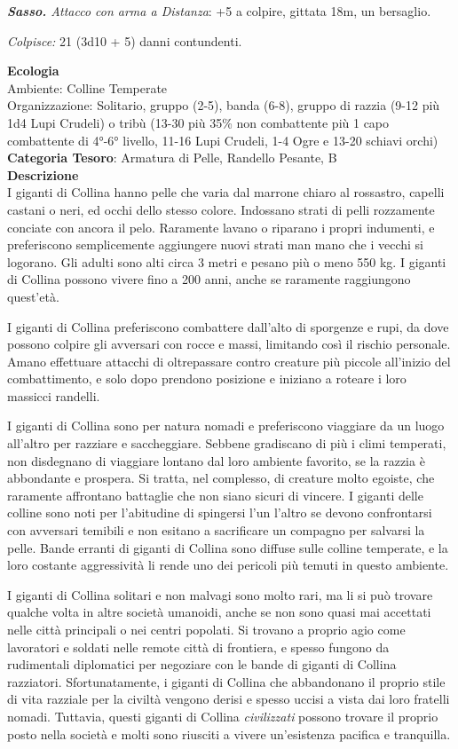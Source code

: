 \begin{multicols}{2}
{\emph{\textbf{Sasso.} Attacco con arma a Distanza}: +5 a colpire, gittata 18m, un bersaglio.

\emph{Colpisce:} 21 (3d10 + 5) danni contundenti.

\textbf{Ecologia}\\
Ambiente: Colline Temperate\\
Organizzazione: Solitario, gruppo (2-5), banda (6-8), gruppo di razzia (9-12 più 1d4 Lupi Crudeli) o tribù (13-30 più 35\% non combattente più 1 capo combattente di 4°-6° livello, 11-16 Lupi Crudeli, 1-4 Ogre e 13-20 schiavi orchi)\\
\textbf{Categoria Tesoro}: Armatura di Pelle, Randello Pesante, B\\
\textbf{Descrizione}\\
I giganti di Collina hanno pelle che varia dal marrone chiaro al rossastro, capelli castani o neri, ed occhi dello stesso colore. Indossano strati di pelli rozzamente conciate con ancora il pelo. Raramente lavano o riparano i propri indumenti, e preferiscono semplicemente aggiungere nuovi strati man mano che i vecchi si logorano. Gli adulti sono alti circa 3 metri e pesano più o meno 550 kg. I giganti di Collina possono vivere fino a 200 anni, anche se raramente raggiungono quest'età.

I giganti di Collina preferiscono combattere dall'alto di sporgenze e rupi, da dove possono colpire gli avversari con rocce e massi, limitando così il rischio personale. Amano effettuare attacchi di oltrepassare contro creature più piccole all'inizio del combattimento, e solo dopo prendono posizione e iniziano a roteare i loro massicci randelli.

I giganti di Collina sono per natura nomadi e preferiscono viaggiare da un luogo all'altro per razziare e saccheggiare. Sebbene gradiscano di più i climi temperati, non disdegnano di viaggiare lontano dal loro ambiente favorito, se la razzia è abbondante e prospera. Si tratta, nel complesso, di creature molto egoiste, che raramente affrontano battaglie che non siano sicuri di vincere. I giganti delle colline sono noti per l'abitudine di spingersi l'un l'altro se devono confrontarsi con avversari temibili e non esitano a sacrificare un compagno per salvarsi la pelle. Bande erranti di giganti di Collina sono diffuse sulle colline temperate, e la loro costante aggressività li rende uno dei pericoli più temuti in questo ambiente.

I giganti di Collina solitari e non malvagi sono molto rari, ma li si può trovare qualche volta in altre società umanoidi, anche se non sono quasi mai accettati nelle città principali o nei centri popolati. Si trovano a proprio agio come lavoratori e soldati nelle remote città di frontiera, e spesso fungono da rudimentali diplomatici per negoziare con le bande di giganti di Collina razziatori. Sfortunatamente, i giganti di Collina che abbandonano il proprio stile di vita razziale per la civiltà vengono derisi e spesso uccisi a vista dai loro fratelli nomadi. Tuttavia, questi giganti di Collina \emph{civilizzati} possono trovare il proprio posto nella società e molti sono riusciti a vivere un'esistenza pacifica e tranquilla.

}
\end{multicols}
